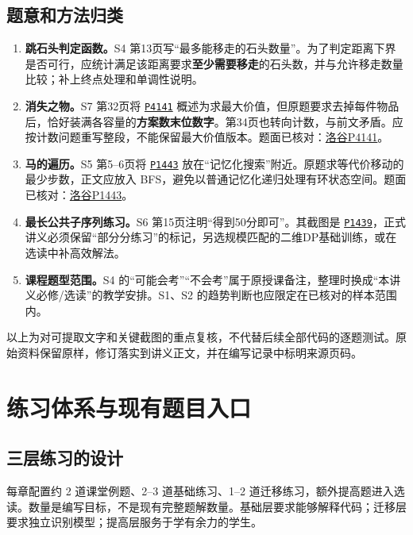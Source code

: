 \documentclass[UTF8,11pt,a4paper,fontset=none]{ctexart}
\newcommand{\prob}[1]{\href{https://www.luogu.com.cn/problem/#1}{\texttt{#1}}}
\begin{document}
\subsection{题意和方法归类}
\begin{enumerate}[resume]
\item \textbf{跳石头判定函数。}S4 第13页写“最多能移走的石头数量”。为了判定距离下界是否可行，应统计满足该距离要求\textbf{至少需要移走}的石头数，并与允许移走数量比较；补上终点处理和单调性说明。
\item \textbf{消失之物。}S7 第32页将 \prob{P4141} 概述为求最大价值，但原题要求去掉每件物品后，恰好装满各容量的\textbf{方案数末位数字}。第34页也转向计数，与前文矛盾。应按计数问题重写整段，不能保留最大价值版本。题面已核对：\href{https://www.luogu.com.cn/problem/P4141}{洛谷P4141}。
\item \textbf{马的遍历。}S5 第5--6页将 \prob{P1443} 放在“记忆化搜索”附近。原题求等代价移动的最少步数，正文应放入 BFS，避免以普通记忆化递归处理有环状态空间。题面已核对：\href{https://www.luogu.com.cn/problem/P1443}{洛谷P1443}。
\item \textbf{最长公共子序列练习。}S6 第15页注明“得到50分即可”。其截图是 \prob{P1439}，正式讲义必须保留“部分分练习”的标记，另选规模匹配的二维DP基础训练，或在选读中补高效解法。
\item \textbf{课程题型范围。}S4 的“可能会考”“不会考”属于原授课备注，整理时换成“本讲义必修/选读”的教学安排。S1、S2 的趋势判断也应限定在已核对的样本范围内。
\end{enumerate}

以上为对可提取文字和关键截图的重点复核，不代替后续全部代码的逐题测试。原始资料保留原样，修订落实到讲义正文，并在编写记录中标明来源页码。

\section{练习体系与现有题目入口}
\subsection{三层练习的设计}
每章配置约 2 道课堂例题、2--3 道基础练习、1--2 道迁移练习，额外提高题进入选读。数量是编写目标，不是现有完整题解数量。基础层要求能够解释代码；迁移层要求独立识别模型；提高层服务于学有余力的学生。
\end{document}
